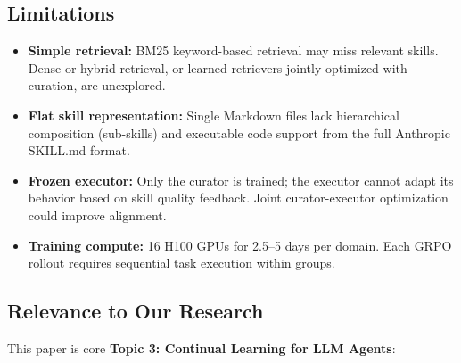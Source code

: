 \documentclass[11pt]{article}
\begin{document}
\subsection{Limitations}

\begin{itemize}
    \item \textbf{Simple retrieval:} BM25 keyword-based retrieval may miss relevant skills. Dense or hybrid retrieval, or learned retrievers jointly optimized with curation, are unexplored.
    \item \textbf{Flat skill representation:} Single Markdown files lack hierarchical composition (sub-skills) and executable code support from the full Anthropic SKILL.md format.
    \item \textbf{Frozen executor:} Only the curator is trained; the executor cannot adapt its behavior based on skill quality feedback. Joint curator-executor optimization could improve alignment.
    \item \textbf{Training compute:} 16 H100 GPUs for 2.5--5 days per domain. Each GRPO rollout requires sequential task execution within groups.
\end{itemize}

\subsection{Relevance to Our Research}

This paper is core \textbf{Topic 3: Continual Learning for LLM Agents}:
\end{document}
